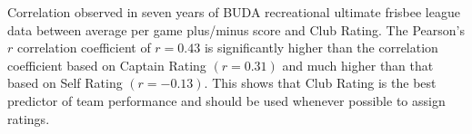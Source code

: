 Correlation observed in seven years of BUDA recreational ultimate frisbee league data between average per game plus/minus score and Club Rating. The Pearson's $r$ correlation coefficient of $r = 0.43$ is significantly higher than the correlation coefficient based on Captain Rating $(r = 0.31)$ and much higher than that based on Self Rating $(r = -0.13)$. This shows that Club Rating is the best predictor of team performance and should be used whenever possible to assign ratings. \label{fig:correlation_club}